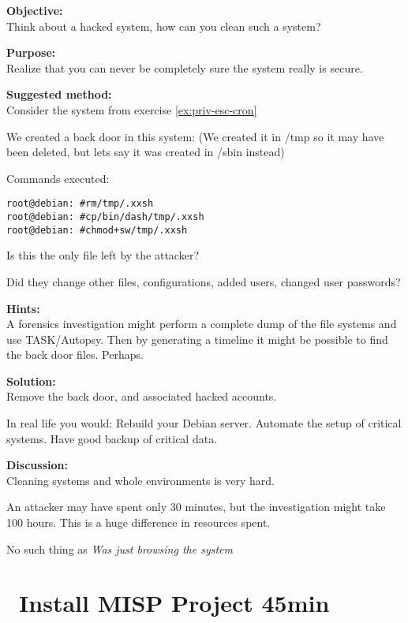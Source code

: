 \documentclass[a4paper,11pt,notitlepage]{report}
\begin{document}

{\bf Objective:}\\
Think about a hacked system, how can you clean such a system?

{\bf Purpose:}\\
Realize that you can never be completely sure the system really is secure.

{\bf Suggested method:}\\
Consider the system from exercise \ref{ex:priv-esc-cron}

We created a back door in this system:
(We created it in /tmp so it may have been deleted, but lets say it was created in /sbin instead)

Commands executed:

\begin{alltt}
root@debian:~# rm /tmp/.xxsh
root@debian:~# cp /bin/dash /tmp/.xxsh
root@debian:~# chmod +sw /tmp/.xxsh
\end{alltt}

Is this the only file left by the attacker?

Did they change other files, configurations, added users, changed user passwords?

{\bf Hints:}\\
A forensics investigation might perform a complete dump of the file systems and use TASK/Autopsy. Then by generating a timeline it might be possible to find the back door files. Perhaps.

{\bf Solution:}\\
Remove the back door, and associated hacked accounts.

In real life you would:
Rebuild your Debian server.
Automate the setup of critical systems.
Have good backup of critical data.

{\bf Discussion:}\\
Cleaning systems and whole environments is very hard.

An attacker may have spent only 30 minutes, but the investigation might take 100 hours. This is a huge difference in resources spent.

No such thing as \emph{Was just browsing the system}


\chapter{\faInfoCircle\ Install MISP Project 45min}
\label{ex:misp-install}

\end{document}
